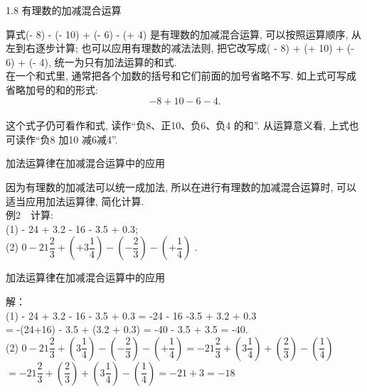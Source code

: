 \documentclass[aspectratio=169]{ctexbeamer} %
\date{\today}
\begin{document}
\begin{frame}[t]{1.8 有理数的加减混合运算}
\begin{spacing}{1.2}
\large
\hspace*{2em} 算式(- 8) - (- 10) + (- 6) - (+ 4) 是有理数的加减混合运算, 可以按照运算顺序, 从左到右逐步计算; 也可以应用有理数的减法法则, 把它改写成( - 8) + (+ 10) + (- 6) + (- 4), 统一为只有加法运算的和式.\\
\hspace{2em} 在一个和式里, 通常把各个加数的括号和它们前面的加号省略不写. 如上式可写成省略加号的和的形式:
\[- 8 + 10 - 6 - 4.\] \\
\hspace*{2em} 这个式子仍可看作和式, 读作“负8、正10、负6、负4 的和”. 从运算意义看, 上式也可读作“负8 加10 减6减4”.
\end{spacing}
\end{frame}


\begin{frame}[t]{加法运算律在加减混合运算中的应用}
\begin{spacing}{1.5}
\large
\hspace{2em} 因为有理数的加减法可以统一成加法, 所以在进行有理数的加减混合运算时, 可以适当应用加法运算律, 简化计算.\\
例2　计算: \\
(1) - 24 + 3.2 - 16 - 3.5 + 0.3; \\
(2) $0 - 21\dfrac{2}{3} + \left(+3\dfrac{1}{4}\right) - \left(-\dfrac{2}{3} \right) - \left(+\dfrac{1}{4} \right)$ . 
\end{spacing}
\end{frame}

\begin{frame}[t]{加法运算律在加减混合运算中的应用}
\begin{spacing}{2.5}
\normalsize
解：\\
(1) - 24 + 3.2 - 16 - 3.5 + 0.3 = -24 - 16 -3.5 + 3.2 + 0.3 \\
= -(24+16) - 3.5 + (3.2 + 0.3) = -40 - 3.5 + 3.5 = -40. \\
(2) $0 - 21\dfrac{2}{3} + \left(3\dfrac{1}{4}\right) - \left(-\dfrac{2}{3} \right) - \left(+\dfrac{1}{4} \right) = - 21\dfrac{2}{3} + \left(3\dfrac{1}{4}\right) + \left(\dfrac{2}{3} \right) - \left(\dfrac{1}{4} \right)$ \\
$= - 21\dfrac{2}{3} + \left(\dfrac{2}{3} \right) + \left(3\dfrac{1}{4}\right) - \left(\dfrac{1}{4} \right) = -21 + 3 = -18$\\
\end{spacing}
\end{frame}
\end{document}
